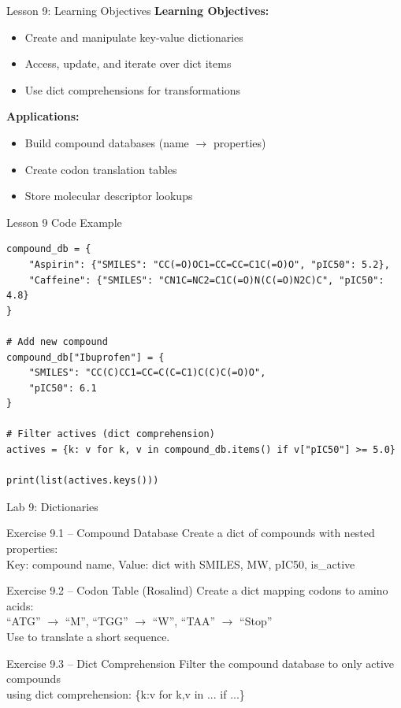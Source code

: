 \documentclass{beamer}
\begin{document}
\begin{frame}{Lesson 9: Learning Objectives}
    \small
    \textbf{Learning Objectives:}
    \begin{itemize}
        \item Create and manipulate key-value dictionaries
        \item Access, update, and iterate over dict items
        \item Use dict comprehensions for transformations
    \end{itemize}
    \vspace{0.5em}
    \textbf{Applications:}
    \begin{itemize}
        \item Build compound databases (name $\to$ properties)
        \item Create codon translation tables
        \item Store molecular descriptor lookups
    \end{itemize}
\end{frame}

\begin{frame}[fragile]{Lesson 9 Code Example}
    \small
    \begin{lstlisting}[style=codeStyle]
compound_db = {
    "Aspirin": {"SMILES": "CC(=O)OC1=CC=CC=C1C(=O)O", "pIC50": 5.2},
    "Caffeine": {"SMILES": "CN1C=NC2=C1C(=O)N(C(=O)N2C)C", "pIC50": 4.8}
}

# Add new compound
compound_db["Ibuprofen"] = {
    "SMILES": "CC(C)CC1=CC=C(C=C1)C(C)C(=O)O",
    "pIC50": 6.1
}

# Filter actives (dict comprehension)
actives = {k: v for k, v in compound_db.items() if v["pIC50"] >= 5.0}

print(list(actives.keys()))
    \end{lstlisting}
\end{frame}

\begin{frame}{\textcolor{labcolor}{Lab 9: Dictionaries}}
    \footnotesize
    \begin{block}{Exercise 9.1 -- Compound Database}
        Create a dict of compounds with nested properties:\\
        Key: compound name, Value: dict with SMILES, MW, pIC50, is\_active
    \end{block}
    \vspace{0.2em}
    \begin{block}{Exercise 9.2 -- Codon Table (Rosalind)}
        Create a dict mapping codons to amino acids:\\
        ``ATG'' $\to$ ``M'', ``TGG'' $\to$ ``W'', ``TAA'' $\to$ ``Stop''\\
        Use to translate a short sequence.
    \end{block}
    \vspace{0.2em}
    \begin{block}{Exercise 9.3 -- Dict Comprehension}
        Filter the compound database to only active compounds\\
        using dict comprehension: \{k:v for k,v in ... if ...\}
    \end{block}
\end{frame}
\end{document}
